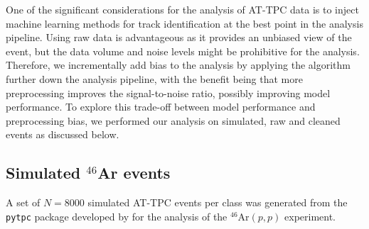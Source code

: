 \documentclass[preprint,12pt]{elsarticle}
\begin{document}
One of the significant considerations for the analysis of AT-TPC data is to inject machine learning methods for track identification at the best point in the analysis pipeline.
Using raw data is advantageous as it provides an unbiased view of the event, but the data volume and noise levels might be prohibitive for the analysis.
Therefore, we incrementally add bias to the analysis by applying the algorithm further down the analysis pipeline, with the benefit being that more preprocessing improves the signal-to-noise ratio, possibly improving model performance.
To explore this trade-off between model performance and preprocessing bias, we performed our analysis on simulated, raw and cleaned events as discussed below.




\subsection{Simulated \texorpdfstring{${}^{46}$Ar}{46Ar} events}\label{sec:data_sim}

A set of $N=8000$ simulated AT-TPC events per class was generated from the \texttt{pytpc} package developed by \citet{Bradt2017a} for the analysis of the  ${}^{46}$Ar$(p, p)$ experiment.
\end{document}
